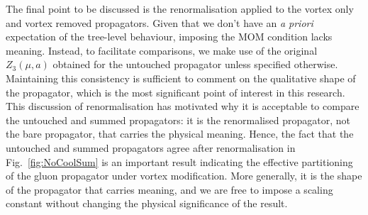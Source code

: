 The final point to be discussed is the renormalisation applied to the vortex only and vortex removed propagators. Given that we don't have an {\it a priori} expectation of the tree-level behaviour, imposing the MOM condition lacks meaning. Instead, to facilitate comparisons, we make use of the original $Z_3(\mu, a)$ obtained for the untouched propagator unless specified otherwise. Maintaining this consistency is sufficient to comment on the qualitative shape of the propagator, which is the most significant point of interest in this research.\\

This discussion of renormalisation has motivated why it is acceptable to compare the untouched and summed propagators: it is the renormalised propagator, not the bare propagator, that carries the physical meaning. Hence, the fact that the untouched and summed propagators agree after renormalisation in Fig.~\ref{fig:NoCoolSum} is an important result indicating the effective partitioning of the gluon propagator under vortex modification. More generally, it is the shape of the propagator that carries meaning, and we are free to impose a scaling constant without changing the physical significance of the result.


